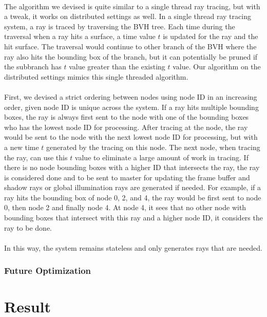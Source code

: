 \documentclass[a4paper, oneside, 10pt]{article}
\begin{document}
\paragraph{} The algorithm we devised is quite similar to a single thread ray tracing, but with a tweak, it works on distributed settings as well.  In a single thread ray tracing system, a ray is traced by traversing the BVH tree. Each time during the traversal when a ray hits a surface, a time value $t$ is updated for the ray and the hit surface.  The traversal would continue to other branch of the BVH where the ray also hits the bounding box of the branch, but it can potentially be pruned if the subbranch has $t$ value greater than the existing $t$ value. Our algorithm on the distributed settings mimics this single threaded algorithm.
\paragraph{} First, we devised a strict ordering between nodes using node ID in an increasing order, given node ID is unique across the system. If a ray hits multiple bounding boxes, the ray is always first sent to the node with one of the bounding boxes who has the lowest node ID for processing.  After tracing at the node, the ray would be sent to the node with the next lowest node ID for processing, but with a new time $t$ generated by the tracing on this node. The next node, when tracing the ray, can use this $t$ value to eliminate a large amount of work in tracing. If there is no node bounding boxes with a higher ID that intersects the ray, the ray is considered done and to be sent to master for updating the frame buffer and shadow rays or global illumination rays are generated if needed.  For example, if a ray hits the bounding box of node 0, 2, and 4, the ray would be first sent to node 0, then node 2 and finally node 4. At node 4, it sees that no other node with bounding boxes that intersect with this ray and a higher node ID, it considers the ray to be done.
\paragraph{} In this way, the system remains stateless and only generates rays that are needed.

\subsubsection{Future Optimization}
\section{Result}





\end{document}
